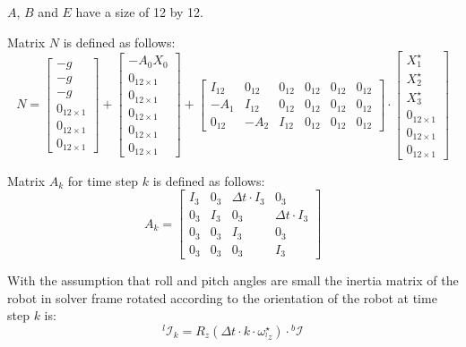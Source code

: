 \documentclass[a4paper,11pt]{article}
\begin{document}
$A$, $B$ and $E$ have a size of 12 by 12.

Matrix $N$ is defined as follows:
\begin{equation}
N = \begin{bmatrix} -g \\ -g \\ -g \\ 0_{12 \times 1} \\ 0_{12 \times 1} \\ 0_{12 \times 1} \end{bmatrix} + \begin{bmatrix} -A_0 X_0 \\ 0_{12 \times 1} \\ 0_{12 \times 1} \\ 0_{12 \times 1} \\ 0_{12 \times 1} \\ 0_{12 \times 1}  \end{bmatrix} + \begin{bmatrix} I_{12} & 0_{12} & 0_{12} & 0_{12} & 0_{12} & 0_{12}\\ -A_1 & I_{12} & 0_{12} & 0_{12} & 0_{12} & 0_{12} \\ 0_{12} & -A_2 & I_{12} & 0_{12} & 0_{12} & 0_{12}\end{bmatrix} \cdot \begin{bmatrix} X_1^\star \\ X_2^\star \\ X_3^\star \\ 0_{12 \times 1} \\ 0_{12 \times 1} \\ 0_{12 \times 1}  \end{bmatrix} 
\end{equation}

Matrix $A_k$ for time step $k$ is defined as follows:
\begin{equation}
A_k = \begin{bmatrix} 
I_3 & 0_3 & \Delta t \cdot I_3 & 0_3 \\
0_3 & I_3 & 0_3 & \Delta t \cdot I_3 \\
0_3 & 0_3 & I_3 & 0_3 \\
0_3 & 0_3 & 0_3 & I_3
\end{bmatrix}
\end{equation}


With the assumption that roll and pitch angles are small the inertia matrix of the robot in solver frame rotated according to the orientation of the robot at time step $k$ is:
\begin{equation}
{}^l\! \mathcal{I}_k = R_z(\Delta t \cdot k \cdot \omega_{{}^l\!z}^\star) \cdot {}^b\!\mathcal{I}
\end{equation}
\end{document}
